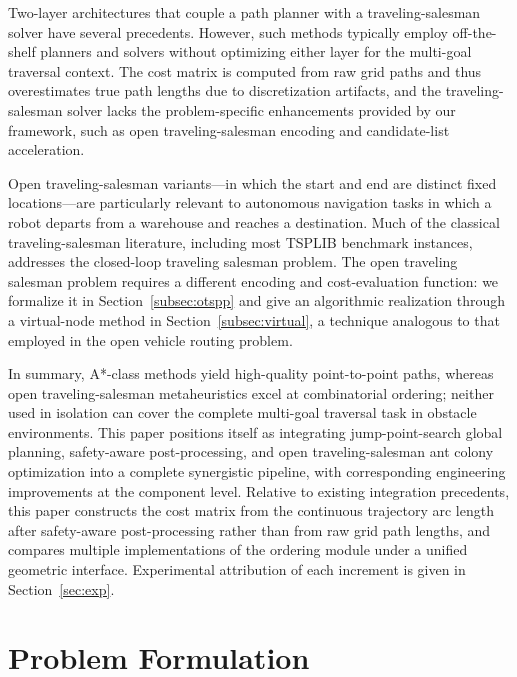 Two-layer architectures that couple a path planner with a traveling-salesman solver have several precedents\textcolor{blue}{\cite{ref1,ref2}}. However, such methods typically employ off-the-shelf planners and solvers without optimizing either layer for the multi-goal traversal context. The cost matrix is computed from raw grid paths and thus overestimates true path lengths due to discretization artifacts, and the traveling-salesman solver lacks the problem-specific enhancements provided by our framework, such as open traveling-salesman encoding and candidate-list acceleration.

Open traveling-salesman variants---in which the start and end are distinct fixed locations---are particularly relevant to autonomous navigation tasks in which a robot departs from a warehouse and reaches a destination. Much of the classical traveling-salesman literature, including most TSPLIB benchmark instances, addresses the closed-loop traveling salesman problem. The open traveling salesman problem requires a different encoding and cost-evaluation function: we formalize it in Section~\textcolor{blue}{\ref{subsec:otspp}} and give an algorithmic realization through a virtual-node method in Section~\textcolor{blue}{\ref{subsec:virtual}}, a technique analogous to that employed in the open vehicle routing problem\textcolor{blue}{\cite{ref32}}.

In summary, A*-class methods yield high-quality point-to-point paths, whereas open traveling-salesman metaheuristics excel at combinatorial ordering; neither used in isolation can cover the complete multi-goal traversal task in obstacle environments. This paper positions itself as integrating jump-point-search global planning, safety-aware post-processing, and open traveling-salesman ant colony optimization into a complete synergistic pipeline, with corresponding engineering improvements at the component level. Relative to existing integration precedents\textcolor{blue}{\cite{ref1,ref2}}, this paper constructs the cost matrix from the continuous trajectory arc length after safety-aware post-processing rather than from raw grid path lengths, and compares multiple implementations of the ordering module under a unified geometric interface. Experimental attribution of each increment is given in Section~\textcolor{blue}{\ref{sec:exp}}.

\section{Problem Formulation}
\label{sec:form}

